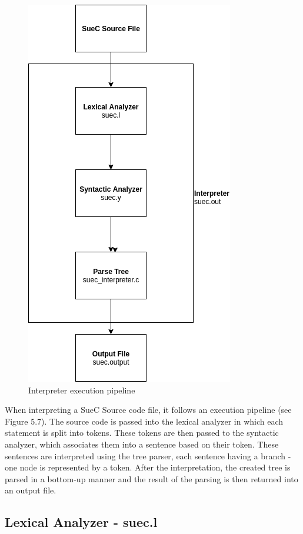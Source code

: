 \documentclass[12pt,a4paper,twoside]{report}
\begin{document}
\begin{figure}[H]
    \centering
    \includegraphics[width=0.6\linewidth]{img/diags/InterpreterPipeline.png}
    \caption{Interpreter execution pipeline}
    \label{fig:conf}
\end{figure}

When interpreting a SueC Source code file, it follows an execution pipeline (see Figure 5.7). The source code is passed into the lexical analyzer in which each statement is split into tokens. These tokens are then passed to the syntactic analyzer, which associates them into a sentence based on their token. These sentences are interpreted using the tree parser, each sentence having a branch - one node is represented by a token. After the interpretation, the created tree is parsed in a bottom-up manner and the result of the parsing is then returned into an output file. 

\subsection{Lexical Analyzer - suec.l}
\end{document}

